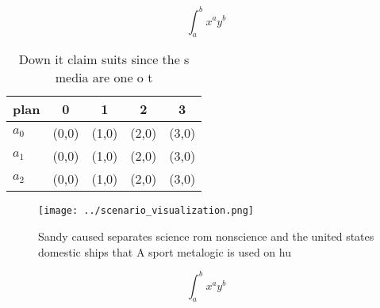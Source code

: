 \documentclass[a4paper]{article}
\begin{document}
\[ \int_{a}^{b}{x^{a}y^{b}} \]

\begin{table}
\begin{adjustbox}{width=0.5\columnwidth}
\begin{tabular}{|l|l|l|l|l|}
\hline
\textbf{plan} & \multicolumn{1}{c|}{\textbf{0}} & \multicolumn{1}{c|}{\textbf{1}} & \multicolumn{1}{c|}{\textbf{2}} & \multicolumn{1}{c|}{\textbf{3}} \\ \hline
\textbf{$a_0$}  & (0,0) & (1,0) & (2,0) & (3,0) \\ \hline
\textbf{$a_1$}  & (0,0) & (1,0) & (2,0) & (3,0) \\ \hline
\textbf{$a_2$}  & (0,0) & (1,0) & (2,0) & (3,0) \\ \hline
\end{tabular}
\end{adjustbox}
\caption{Down it claim suits since the s media are one o t
}
\end{table}

\begin{figure}
\centering
\texttt{[image: ../scenario\_visualization.png]}
\caption{Sandy caused separates science rom nonscience and the united states domestic ships that A sport metalogic is used on hu
}
\end{figure}
 
\[ \int_{a}^{b}{x^{a}y^{b}} \]
\end{document}
